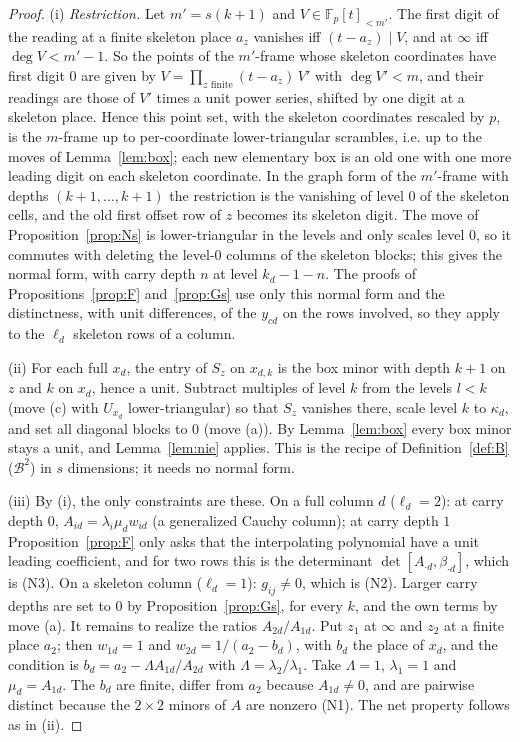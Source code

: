 \documentclass[11pt]{amsart}
\theoremstyle{definition}
\theoremstyle{plain}
\newcommand{\F}{\mathbb{F}}
\begin{document}
\begin{proof}
(i) \emph{Restriction.} Let $m'=s(k+1)$ and $V\in\F_p[t]_{<m'}$. The first digit of the reading at a finite skeleton place $a_z$ vanishes iff $(t-a_z)\mid V$, and at $\infty$ iff $\deg V<m'-1$. So the points of the $m'$-frame whose skeleton coordinates have first digit $0$ are given by $V=\prod_{z\text{ finite}}(t-a_z)\,V'$ with $\deg V'<m$, and their readings are those of $V'$ times a unit power series, shifted by one digit at a skeleton place. Hence this point set, with the skeleton coordinates rescaled by $p$, is the $m$-frame up to per-coordinate lower-triangular scrambles, i.e. up to the moves of Lemma~\ref{lem:box}; each new elementary box is an old one with one more leading digit on each skeleton coordinate. In the graph form of the $m'$-frame with depths $(k+1,\dots,k+1)$ the restriction is the vanishing of level $0$ of the skeleton cells, and the old first offset row of $z$ becomes its skeleton digit. The move of Proposition~\ref{prop:Ns} is lower-triangular in the levels and only scales level $0$, so it commutes with deleting the level-$0$ columns of the skeleton blocks; this gives the normal form, with carry depth $n$ at level $k_d-1-n$. The proofs of Propositions~\ref{prop:F} and~\ref{prop:Gs} use only this normal form and the distinctness, with unit differences, of the $y_{cd}$ on the rows involved, so they apply to the $\ell_d$ skeleton rows of a column.

(ii) For each full $x_d$, the entry of $S_z$ on $x_{d,k}$ is the box minor with depth $k+1$ on $z$ and $k$ on $x_d$, hence a unit. Subtract multiples of level $k$ from the levels $l<k$ (move (c) with $U_{x_d}$ lower-triangular) so that $S_z$ vanishes there, scale level $k$ to $\kappa_d$, and set all diagonal blocks to $0$ (move (a)). By Lemma~\ref{lem:box} every box minor stays a unit, and Lemma~\ref{lem:nie} applies. This is the recipe of Definition~\ref{def:B}($\mathcal B^2$) in $s$ dimensions; it needs no normal form.

(iii) By (i), the only constraints are these. On a full column $d$ ($\ell_d=2$): at carry depth $0$, $A_{id}=\lambda_i\mu_dw_{id}$ (a generalized Cauchy column); at carry depth $1$ Proposition~\ref{prop:F} only asks that the interpolating polynomial have a unit leading coefficient, and for two rows this is the determinant $\det[A_{\cdot d},\beta_{\cdot d}]$, which is (N3). On a skeleton column ($\ell_d=1$): $g_{ij}\ne0$, which is (N2). Larger carry depths are set to $0$ by Proposition~\ref{prop:Gs}, for every $k$, and the own terms by move (a). It remains to realize the ratios $A_{2d}/A_{1d}$. Put $z_1$ at $\infty$ and $z_2$ at a finite place $a_2$; then $w_{1d}=1$ and $w_{2d}=1/(a_2-b_d)$, with $b_d$ the place of $x_d$, and the condition is $b_d=a_2-\Lambda A_{1d}/A_{2d}$ with $\Lambda=\lambda_2/\lambda_1$. Take $\Lambda=1$, $\lambda_1=1$ and $\mu_d=A_{1d}$. The $b_d$ are finite, differ from $a_2$ because $A_{1d}\ne0$, and are pairwise distinct because the $2\times2$ minors of $A$ are nonzero (N1). The net property follows as in (ii).
\end{proof}
\end{document}
